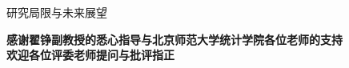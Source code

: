 \documentclass[aspectratio=169,9pt,xcolor=dvipsnames]{beamer}
\newcommand{\highlight}[1]{\textcolor{myred}{\textbf{#1}}}
\begin{document}
\begin{frame}{研究局限与未来展望}
  \vspace{0.2cm}
  \begin{center}
    \large\textbf{感谢翟铮副教授的悉心指导与北京师范大学统计学院各位老师的支持}\\[0.3cm]
    \LARGE\highlight{欢迎各位评委老师提问与批评指正}
  \end{center}
\end{frame}
\end{document}
